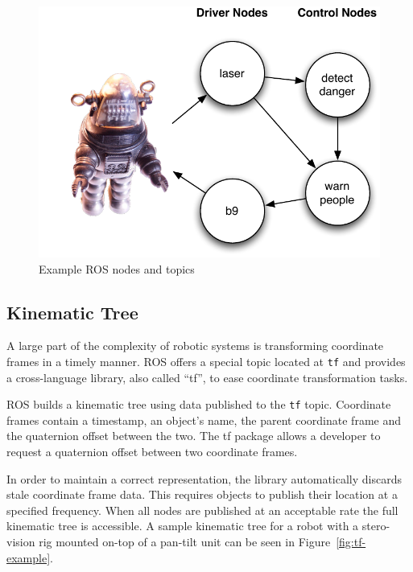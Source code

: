 \begin{figure}[ht]
\includegraphics{images/middleware-ros.pdf}
\caption{Example ROS nodes and topics\label{fig:middleware-ros}}
\end{figure}

\subsection{Kinematic Tree}
\label{sub:ros_tf}
A large part of the complexity of robotic systems is transforming coordinate frames in a timely manner. ROS offers a special topic located at \verb!tf! and provides a cross-language library, also called ``tf'', to ease coordinate transformation tasks.

ROS builds a kinematic tree using data published to the \verb!tf! topic. Coordinate frames contain a timestamp, an object's name, the parent coordinate frame and the quaternion offset between the two. The tf package allows a developer to request a quaternion offset between two coordinate frames. 

In order to maintain a correct representation, the library automatically discards stale coordinate frame data. This requires objects to publish their location at a specified frequency. When all nodes are published at an acceptable rate the full kinematic tree is accessible. A sample kinematic tree for a robot with a stero-vision rig mounted on-top of a pan-tilt unit can be seen in Figure~\ref{fig:tf-example}.

